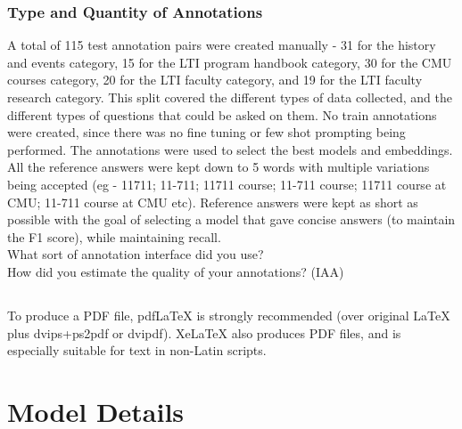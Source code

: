 \documentclass[11pt]{article}
\begin{document}
\subsubsection{Type and Quantity of Annotations}
A total of 115 test annotation pairs were created manually - 31 for the history and events category, 15 for the LTI program handbook category, 30 for the CMU courses category, 20 for the LTI faculty category, and 19 for the LTI faculty research category.
This split covered the different types of data collected, and the different types of questions that could be asked on them. No train annotations were created, since there was no fine tuning or few shot prompting being performed. The annotations were used to select the best models and embeddings.
All the reference answers were kept down to 5 words with multiple variations being accepted (eg - 11711; 11-711; 11711 course; 11-711 course; 11711 course at CMU; 11-711 course at CMU etc). Reference answers were kept as short as possible with the goal of selecting a model that gave concise answers (to maintain the F1 score), while maintaining recall.
\\ What sort of annotation interface did you use?
\\ How did you estimate the quality of your annotations? (IAA)

\subsection{}

To produce a PDF file, pdf\LaTeX{} is strongly recommended (over original \LaTeX{} plus dvips+ps2pdf or dvipdf). Xe\LaTeX{} also produces PDF files, and is especially suitable for text in non-Latin scripts.

\section{Model Details}



\end{document}
